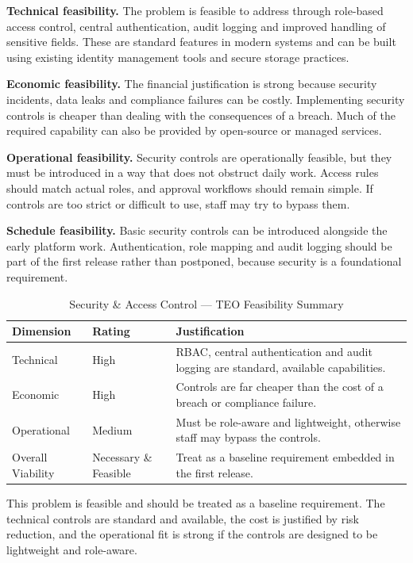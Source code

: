 \documentclass[12pt,a4paper]{report}
\begin{document}
\textbf{Technical feasibility.} The problem is feasible to address through role-based access control, central authentication, audit logging and improved handling of sensitive fields. These are standard features in modern systems and can be built using existing identity management tools and secure storage practices.

\textbf{Economic feasibility.} The financial justification is strong because security incidents, data leaks and compliance failures can be costly. Implementing security controls is cheaper than dealing with the consequences of a breach. Much of the required capability can also be provided by open-source or managed services.

\textbf{Operational feasibility.} Security controls are operationally feasible, but they must be introduced in a way that does not obstruct daily work. Access rules should match actual roles, and approval workflows should remain simple. If controls are too strict or difficult to use, staff may try to bypass them.

\textbf{Schedule feasibility.} Basic security controls can be introduced alongside the early platform work. Authentication, role mapping and audit logging should be part of the first release rather than postponed, because security is a foundational requirement.

\begin{table}[H]
\centering
\renewcommand{\arraystretch}{1.3}
\begin{tabularx}{\textwidth}{|p{3cm}|p{2.5cm}|X|}
\hline
\rowcolor{secondary}
\textbf{Dimension} & \textbf{Rating} & \textbf{Justification} \\
\hline
Technical & High & RBAC, central authentication and audit logging are standard, available capabilities. \\
\hline
Economic & High & Controls are far cheaper than the cost of a breach or compliance failure. \\
\hline
Operational & Medium & Must be role-aware and lightweight, otherwise staff may bypass the controls. \\
\hline
Overall Viability & Necessary \& Feasible & Treat as a baseline requirement embedded in the first release. \\
\hline
\end{tabularx}
\caption{Security \& Access Control --- TEO Feasibility Summary}
\end{table}

\begin{summaryBox}
This problem is feasible and should be treated as a baseline requirement. The technical controls are standard and available, the cost is justified by risk reduction, and the operational fit is strong if the controls are designed to be lightweight and role-aware.
\end{summaryBox}
\end{document}
